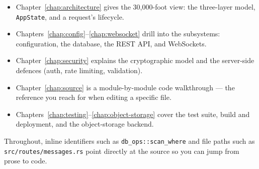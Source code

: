 \begin{itemize}
  \item Chapter~\ref{chap:architecture} gives the 30{,}000-foot view: the
        three-layer model, \verb|AppState|, and a request's lifecycle.
  \item Chapters~\ref{chap:config}--\ref{chap:websocket} drill into the
        subsystems: configuration, the database, the REST API, and WebSockets.
  \item Chapter~\ref{chap:security} explains the cryptographic model and the
        server-side defences (auth, rate limiting, validation).
  \item Chapter~\ref{chap:source} is a module-by-module code walkthrough ---
        the reference you reach for when editing a specific file.
  \item Chapters~\ref{chap:testing}--\ref{chap:object-storage} cover the test
        suite, build and deployment, and the object-storage backend.
\end{itemize}

Throughout, inline identifiers such as \verb|db_ops::scan_where| and file paths
such as \verb|src/routes/messages.rs| point directly at the source so you can
jump from prose to code.
